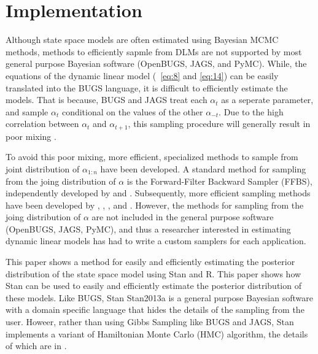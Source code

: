 \documentclass{article}
\begin{document}
\section{Implementation}
\label{sec:implementation}


Although state space models are often estimated using Bayesian MCMC methods, methods to efficiently sapmle from DLMs are not supported by most general purpose Bayesian software (OpenBUGS, JAGS, and PyMC).
While, the  equations of the dynamic linear model (~\eqref{eq:8} and \eqref{eq:14}) can be easily translated into the BUGS language, it is difficult to efficiently estimate the models.
That is because, BUGS and JAGS treat each $\alpha_{t}$ as a seperate parameter, and sample $\alpha_{t}$ conditional on the values of the other $\alpha_{-t}$.
Due to the high correlation between $\alpha_{t}$ and $\alpha_{t+1}$, this sampling procedure will generally result in poor mixing \parencite[477]{Jackman2009}.

To avoid this poor mixing, more efficient, specialized methods to sample from joint distribution of $\alpha_{1:n}$ have been developed.
A standard method for sampling from the joing distribution of $\alpha$ is the Forward-Filter Backward Sampler (FFBS), independently developed by \textcite{CarterKohn1994} and \textcite{Fruehwirth-Schnatter1994}.
Subsequently, more efficient sampling methods have been developed by \textcite{DeJongShephard1995}, \textcite{DurbinKoopman2002}, \textcite{StricklandTurnerDenhamEtAl2009}, and \textcite{ChanJeliazkov2009}.
However, the methods for sampling from the joing distribution of $\alpha$ are not included in the general purpose software (OpenBUGS, JAGS, PyMC), and thus a researcher interested in estimating dynamic linear models has had to write a custom samplers for each application.

This paper shows a method for easily and efficiently estimating the posterior distribution of the state space model using Stan and R.
This paper shows how Stan can be used to easily and efficiently estimate the posterior distribution of these models.
Like BUGS, Stan \textcite{Stan2013}{Stan2013a} is a general purpose Bayesian software with a domain specific language that hides the details of the sampling from the user.
Howeer, rather than using Gibbs Sampling like BUGS and JAGS, Stan implements a variant of Hamiltonian Monte Carlo (HMC) algorithm, the details of which are in \textcite{HoffmanGelman2013}.
\end{document}
